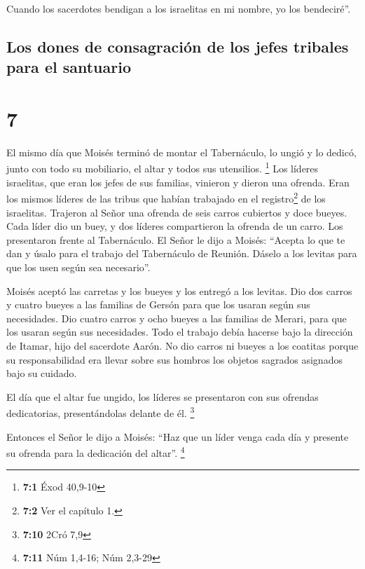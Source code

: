  Cuando los sacerdotes bendigan a los israelitas en mi
nombre, yo los bendeciré''.

\hypertarget{los-dones-de-consagraciuxf3n-de-los-jefes-tribales-para-el-santuario}{%
\subsection{Los dones de consagración de los jefes tribales para el
santuario}\label{los-dones-de-consagraciuxf3n-de-los-jefes-tribales-para-el-santuario}}

\hypertarget{section-6}{%
\section{7}\label{section-6}}

 El mismo día que Moisés terminó de montar el Tabernáculo,
lo ungió y lo dedicó, junto con todo su mobiliario, el altar y todos sus
utensilios. \footnote{\textbf{7:1} Éxod 40,9-10}  Los
líderes israelitas, que eran los jefes de sus familias, vinieron y
dieron una ofrenda. Eran los mismos líderes de las tribus que habían
trabajado en el registro\footnote{\textbf{7:2} Ver el capítulo 1.} de
los israelitas.  Trajeron al Señor una ofrenda de seis
carros cubiertos y doce bueyes. Cada líder dio un buey, y dos líderes
compartieron la ofrenda de un carro. Los presentaron frente al
Tabernáculo.  El Señor le dijo a Moisés: 
``Acepta lo que te dan y úsalo para el trabajo del Tabernáculo de
Reunión. Dáselo a los levitas para que los usen según sea necesario''.

 Moisés aceptó las carretas y los bueyes y los entregó a
los levitas.  Dio dos carros y cuatro bueyes a las
familias de Gersón para que los usaran según sus necesidades.
 Dio cuatro carros y ocho bueyes a las familias de Merari,
para que los usaran según sus necesidades. Todo el trabajo debía hacerse
bajo la dirección de Itamar, hijo del sacerdote Aarón.  No
dio carros ni bueyes a los coatitas porque su responsabilidad era llevar
sobre sus hombros los objetos sagrados asignados bajo su cuidado.

 El día que el altar fue ungido, los líderes se
presentaron con sus ofrendas dedicatorias, presentándolas delante de él.
\footnote{\textbf{7:10} 2Cró 7,9}

 Entonces el Señor le dijo a Moisés: ``Haz que un líder
venga cada día y presente su ofrenda para la dedicación del altar''.
\footnote{\textbf{7:11} Núm 1,4-16; Núm 2,3-29}

